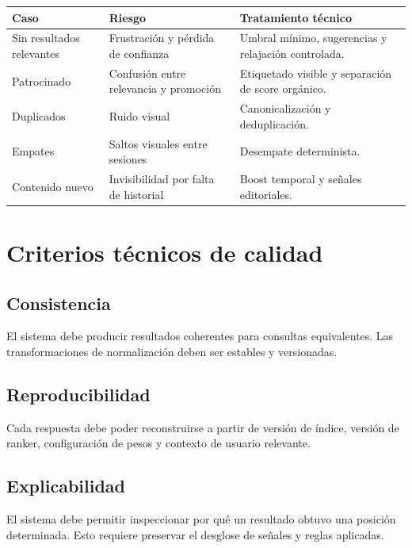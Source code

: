 \documentclass[12pt,a4paper]{article}
\begin{document}
\begin{longtable}{p{4cm}p{5cm}p{5cm}}
\toprule
\textbf{Caso} & \textbf{Riesgo} & \textbf{Tratamiento técnico} \\
\midrule
\endhead

Sin resultados relevantes & Frustración y pérdida de confianza & Umbral mínimo, sugerencias y relajación controlada. \\

Patrocinado & Confusión entre relevancia y promoción & Etiquetado visible y separación de score orgánico. \\

Duplicados & Ruido visual & Canonicalización y deduplicación. \\

Empates & Saltos visuales entre sesiones & Desempate determinista. \\

Contenido nuevo & Invisibilidad por falta de historial & Boost temporal y señales editoriales. \\

\bottomrule
\end{longtable}

\section{Criterios técnicos de calidad}

\subsection{Consistencia}

El sistema debe producir resultados coherentes para consultas equivalentes. Las transformaciones de normalización deben ser estables y versionadas.

\subsection{Reproducibilidad}

Cada respuesta debe poder reconstruirse a partir de versión de índice, versión de ranker, configuración de pesos y contexto de usuario relevante.

\subsection{Explicabilidad}

El sistema debe permitir inspeccionar por qué un resultado obtuvo una posición determinada. Esto requiere preservar el desglose de señales y reglas aplicadas.
\end{document}
